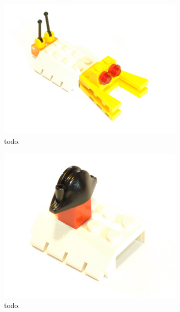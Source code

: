 	\begin{figure}[ht!]
		\centering
		\includegraphics[width=90mm]{images/rawImages/BILD_7}
		\caption{todo.}
		\label{todo}
	\end{figure}
	
	\begin{figure}[ht!]
		\centering
		\includegraphics[width=90mm]{images/rawImages/BILD_8}
		\caption{todo.}
		\label{todo}
	\end{figure}